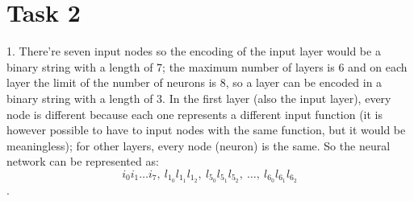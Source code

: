 \documentclass[12pt]{article}
\begin{document}
\section{Task 2}
1. There're seven input nodes so the encoding of the input layer would be a binary string with a length of 7; the maximum number of layers is 6 and on each layer the limit of the number of neurons is 8, so a layer can be encoded in a binary string with a length of 3. In the first layer (also the input layer), every node is different because each one represents a different input function (it is however possible to have to input nodes with the same function, but it would be meaningless); for other layers, every node (neuron) is the same. So the neural network can be represented as:
$$
{i_0i_1\ldots i_7,\ l_{1_0}l_{1_1}l_{1_2},\ l_{5_0}l_{5_1}l_{5_2},\ \ldots,\ l_{6_0}l_{6_1}l_{6_2}}
$$
. 
\end{document}
